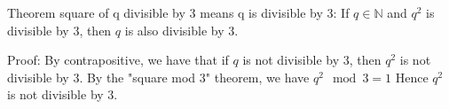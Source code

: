 Theorem square of q divisible by 3 means q is divisible by 3:
If $q \in \mathbb{N}$ and $q^2$ is divisible by $3$, then $q$ is also divisible by $3$.


Proof:
By contrapositive, we have that if $q$ is not divisible by $3$, then $q^2$ is not divisible by $3$.
By the "square mod 3" theorem, we have $q^2 \mod 3 = 1$
Hence $q^2$ is not divisible by $3$.
